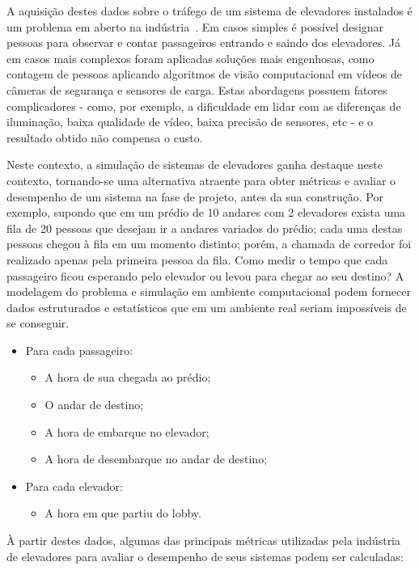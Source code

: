 A aquisição destes dados sobre o tráfego de um sistema de elevadores instalados é um problema em aberto na indústria~\cite{KOEHLEROTTIGER02}. Em casos simples é possível designar pessoas para observar e contar passageiros entrando e saindo dos elevadores. Já em casos mais complexos foram aplicadas soluções mais engenhosas, como contagem de pessoas aplicando algoritmos de visão computacional em vídeos de câmeras de segurança e sensores de carga. Estas abordagens possuem fatores complicadores - como, por exemplo, a dificuldade em lidar com as diferenças de iluminação, baixa qualidade de vídeo, baixa precisão de sensores, etc - e o resultado obtido não compensa o custo.

Neste contexto, a simulação de sistemas de elevadores ganha destaque neste contexto, tornando-se uma alternativa atraente para obter métricas e avaliar o desempenho de um sistema na fase de projeto, antes da sua construção. Por exemplo, supondo que em um prédio de 10 andares com 2 elevadores exista uma fila de 20 pessoas que desejam ir a andares variados do prédio; cada uma destas pessoas chegou à fila em um momento distinto; porém, a chamada de corredor foi realizado apenas pela primeira pessoa da fila. Como medir o tempo que cada passageiro ficou esperando pelo elevador ou levou para chegar ao seu destino? A modelagem do problema e simulação em ambiente computacional podem fornecer dados estruturados e estatísticos que em um ambiente real seriam impossíveis de se conseguir.

\begin{itemize}
  \item Para cada passageiro:
  \begin{itemize}
    \item A hora de sua chegada ao prédio;
    \item O andar de destino;
    \item A hora de embarque no elevador;
    \item A hora de desembarque no andar de destino;
  \end{itemize}
  \item Para cada elevador:
  \begin{itemize}
    \item A hora em que partiu do lobby.
  \end{itemize}
\end{itemize}

À partir destes dados, algumas das principais métricas utilizadas pela indústria de elevadores para avaliar o desempenho de seus sistemas podem ser calculadas:

